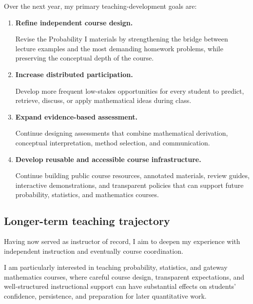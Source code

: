 \documentclass[11pt]{article}
\begin{document}
Over the next year,
my primary teaching-development goals are:

\begin{enumerate}

\item
\textbf{Refine independent course design.}

Revise the Probability I materials by strengthening the bridge
between lecture examples and the most demanding homework
problems,
while preserving the conceptual depth of the course.

\item
\textbf{Increase distributed participation.}

Develop more frequent low-stakes opportunities for every
student to predict,
retrieve,
discuss,
or apply mathematical ideas during class.

\item
\textbf{Expand evidence-based assessment.}

Continue designing assessments that combine mathematical
derivation,
conceptual interpretation,
method selection,
and communication.

\item
\textbf{Develop reusable and accessible course infrastructure.}

Continue building public course resources,
annotated materials,
review guides,
interactive demonstrations,
and transparent policies that can support future probability,
statistics,
and mathematics courses.

\end{enumerate}

\subsection{Longer-term teaching trajectory}

Having now served as instructor of record,
I aim to deepen my experience with independent instruction and
eventually course coordination.

I am particularly interested in teaching probability,
statistics,
and gateway mathematics courses,
where careful course design,
transparent expectations,
and well-structured instructional support can have substantial
effects on students' confidence,
persistence,
and preparation for later quantitative work.

\end{document}
